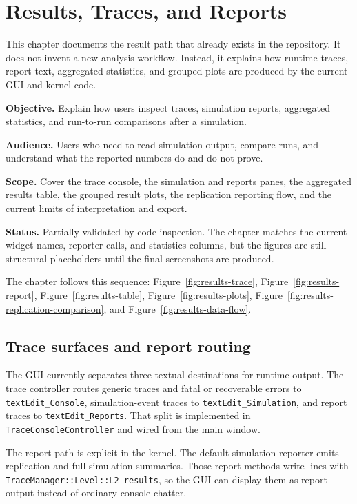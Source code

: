 \chapter{Results, Traces, and Reports}
\label{chap:results-traces-and-reports}

This chapter documents the result path that already exists in the repository.
It does not invent a new analysis workflow. Instead, it explains how runtime
traces, report text, aggregated statistics, and grouped plots are produced by
the current GUI and kernel code.

\noindent\textbf{Objective.} Explain how users inspect traces, simulation
reports, aggregated statistics, and run-to-run comparisons after a simulation.

\noindent\textbf{Audience.} Users who need to read simulation output, compare
runs, and understand what the reported numbers do and do not prove.

\noindent\textbf{Scope.} Cover the trace console, the simulation and reports
panes, the aggregated results table, the grouped result plots, the replication
reporting flow, and the current limits of interpretation and export.

\noindent\textbf{Status.} Partially validated by code inspection. The chapter
matches the current widget names, reporter calls, and statistics columns, but
the figures are still structural placeholders until the final screenshots are
produced.

The chapter follows this sequence:
Figure~\ref{fig:results-trace},
Figure~\ref{fig:results-report},
Figure~\ref{fig:results-table},
Figure~\ref{fig:results-plots},
Figure~\ref{fig:results-replication-comparison}, and
Figure~\ref{fig:results-data-flow}.

\section{Trace surfaces and report routing}
\label{sec:results-trace-surfaces}

The GUI currently separates three textual destinations for runtime output. The
trace controller routes generic traces and fatal or recoverable errors to
\texttt{textEdit\_Console}, simulation-event traces to
\texttt{textEdit\_Simulation}, and report traces to
\texttt{textEdit\_Reports}. That split is implemented in
\texttt{TraceConsoleController} and wired from the main window.

The report path is explicit in the kernel. The default simulation reporter
emits replication and full-simulation summaries. Those report methods write
lines with \texttt{TraceManager::Level::L2\_results}, so the GUI can display
them as report output instead of ordinary console chatter.

